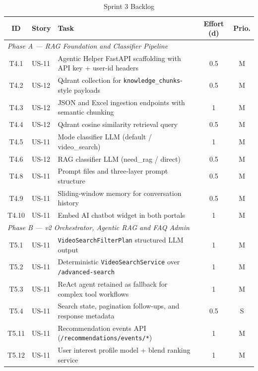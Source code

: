 \begin{table}[H]
\centering
\caption{Sprint 3 Backlog}
\label{tab:sprint3_backlog}
\begin{tabularx}{\textwidth}{clXcc}
\toprule
\textbf{ID} & \textbf{Story} & \textbf{Task} & \textbf{Effort (d)} & \textbf{Prio.} \\
\midrule
\multicolumn{5}{l}{\textit{Phase A — RAG Foundation and Classifier Pipeline}} \\
\midrule
T4.1 & US-11 & Agentic Helper FastAPI scaffolding with API key + user-id headers & 0.5 & M \\
T4.2 & US-12 & Qdrant collection for \texttt{knowledge\_chunks}-style payloads & 0.5 & M \\
T4.3 & US-12 & JSON and Excel ingestion endpoints with semantic chunking           & 1 & M \\
T4.4 & US-12 & Qdrant cosine similarity retrieval query                            & 0.5 & M \\
T4.5 & US-11 & Mode classifier LLM (default / video\_search)                       & 1 & M \\
T4.6 & US-12 & RAG classifier LLM (need\_rag / direct)                             & 0.5 & M \\
T4.8 & US-11 & Prompt files and three-layer prompt structure                      & 0.5 & M \\
T4.9 & US-11 & Sliding-window memory for conversation history                     & 0.5 & M \\
T4.10 & US-11 & Embed AI chatbot widget in both portals                           & 1 & M \\
\midrule
\multicolumn{5}{l}{\textit{Phase B — v2 Orchestrator, Agentic RAG and FAQ Admin}} \\
\midrule
T5.1 & US-11 & \texttt{VideoSearchFilterPlan} structured LLM output              & 1 & M \\
T5.2 & US-11 & Deterministic \texttt{VideoSearchService} over \texttt{/advanced-search} & 1 & M \\
T5.3 & US-11 & ReAct agent retained as fallback for complex tool workflows & 1 & M \\
T5.4 & US-11 & Search state, pagination follow-ups, and response metadata             & 0.5 & S \\
T5.11 & US-11 & Recommendation events API (\texttt{/recommendations/events/*})      & 1 & M \\
T5.12 & US-11 & User interest profile model + blend ranking service               & 1 & M \\

\end{tabularx}
\end{table}
